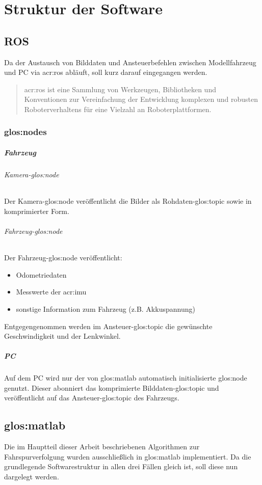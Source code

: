 \chapter{Struktur der Software}

\section{ROS}
Da der Austausch von Bilddaten und Ansteuerbefehlen zwischen Modellfahrzeug und PC via \gls{acr:ros} \autocite{ROSOrgPowering} abläuft, soll kurz darauf eingegangen werden. 
\begin{quotation}
\gls{acr:ros} ist eine Sammlung von Werkzeugen, Bibliotheken und Konventionen zur Vereinfachung der Entwicklung komplexen und robusten Roboterverhaltens für eine Vielzahl an Roboterplattformen. \autocite{ROSOrgROS}
\end{quotation}

\subsection{\glspl{glos:node}}
\paragraph{Fahrzeug}
\subparagraph{Kamera-\gls{glos:node}}
Der Kamera-\gls{glos:node} veröffentlicht die Bilder als Rohdaten-\gls{glos:topic} sowie in komprimierter Form.
\subparagraph{Fahrzeug-\gls{glos:node}}
Der Fahrzeug-\gls{glos:node} veröffentlicht:
\begin{itemize}
\item Odometriedaten 
\item Messwerte der \gls{acr:imu}
\item sonstige Information zum Fahrzeug (z.B. Akkuspannung)
\end{itemize}
Entgegengenommen werden im Ansteuer-\gls{glos:topic} die gewünschte Geschwindigkeit und der Lenkwinkel.
\paragraph{PC}
Auf dem PC wird nur der von \gls{glos:matlab} automatisch initialisierte \gls{glos:node} genutzt. Dieser abonniert das komprimierte Bilddaten-\gls{glos:topic} und veröffentlicht auf das Ansteuer-\gls{glos:topic} des Fahrzeugs.

\section{\gls{glos:matlab}}
Die im Hauptteil dieser Arbeit beschriebenen Algorithmen zur Fahrspurverfolgung wurden ausschließlich in \gls{glos:matlab} implementiert. Da die grundlegende Softwarestruktur in allen drei Fällen gleich ist, soll diese nun dargelegt werden.

